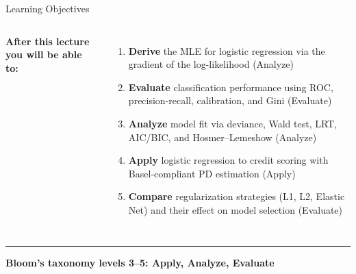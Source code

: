 \documentclass[8pt,aspectratio=169]{beamer}
\newcommand{\bottomnote}[1]{%
\vfill
\vspace{-2mm}
\textcolor{mllavender2}{\rule{\textwidth}{0.4pt}}
\vspace{1mm}
\footnotesize
\textbf{#1}
}
\begin{document}
\begin{frame}[t]{Learning Objectives}
\begin{columns}[T]
\small
\textbf{After this lecture you will be able to:}

\begin{enumerate}
\setlength{\itemsep}{3pt}
\item \textbf{Derive} the MLE for logistic regression via the gradient of the log-likelihood (Analyze)
\item \textbf{Evaluate} classification performance using ROC, precision-recall, calibration, and Gini (Evaluate)
\item \textbf{Analyze} model fit via deviance, Wald test, LRT, AIC/BIC, and Hosmer--Lemeshow (Analyze)
\item \textbf{Apply} logistic regression to credit scoring with Basel-compliant PD estimation (Apply)
\item \textbf{Compare} regularization strategies (L1, L2, Elastic Net) and their effect on model selection (Evaluate)
\end{enumerate}

\footnotesize
\vspace{4mm}
\end{columns}

\bottomnote{Bloom's taxonomy levels 3--5: Apply, Analyze, Evaluate}
\end{frame}
\end{document}
